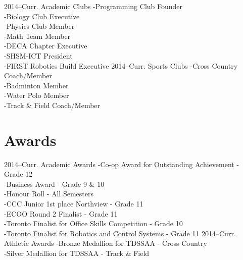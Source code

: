 \documentclass[]{chandan-cv}
\begin{document}
\begin{entrylist}
  \entry
    {2014–Curr.}
    {Academic Clubs}
    {}
    { -Programming Club Founder
    \\-Biology Club Executive
    \\-Physics Club Member
    \\-Math Team Member
    \\-DECA Chapter Executive
    \\-SHSM-ICT President
    \\-FIRST Robotics Build Executive}
  \entry
    {2014–Curr.}
    {Sports Clubs}
    {}
    { -Cross Country Coach/Member
    \\-Badminton Member
    \\-Water Polo Member
    \\-Track \& Field Coach/Member}
\end{entrylist}

\section{Awards}

\begin{entrylist}
  \entry
    {2014–Curr.}
    {Academic Awards}
    {}
    { -Co-op Award for Outstanding Achievement - Grade 12
    \\-Business Award - Grade 9 \& 10
    \\-Honour Roll - All Semesters
    \\-CCC Junior 1st place Northview - Grade 11
    \\-ECOO Round 2 Finalist - Grade 11
    \\-Toronto Finalist for Office Skills Competition - Grade 10
    \\-Toronto Finalist for Robotics and Control Systems - Grade 11}
  \entry
    {2014–Curr.}
    {Athletic Awards}
    {}
    { -Bronze Medallion for TDSSAA - Cross Country
    \\-Silver Medallion for TDSSAA - Track \& Field}
\end{entrylist}
\end{document}
